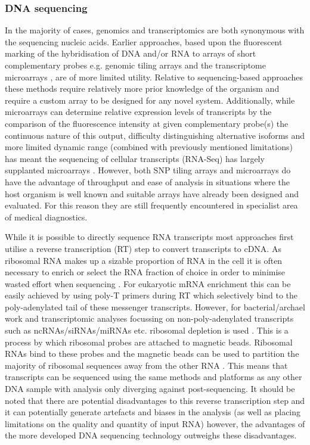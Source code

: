 \subsubsection{DNA sequencing}

In the majority of cases, genomics and transcriptomics are both synonymous with
the sequencing nucleic acids. Earlier approaches, based upon the fluorescent
marking of the hybridisation of DNA and/or RNA to arrays of short complementary probes 
e.g. genomic tiling arrays and the transcriptome microarrays \citep{Mockler2005}, are of more
limited utility.   Relative to sequencing-based approaches these methods
require relatively more prior knowledge of the organism and require a custom array to be
designed for any novel system. Additionally, while microarrays can determine relative expression levels
of transcripts by the comparison of the fluorescence intensity at given complementary probe(s)
the continuous nature of this output, difficulty distinguishing alternative isoforms 
and more limited dynamic range (combined with previously mentioned limitations) 
has meant the sequencing of cellular transcripts (RNA-Seq) has largely supplanted microarrays \citep{Wang2009}.
However, both SNP tiling arrays and microarrays do have the advantage of throughput and ease of analysis
in situations where the host organism is well known and suitable arrays have already been designed
and evaluated.  For this reason they are still frequently encountered in specialist area of medical 
diagnostics.


While it is possible to directly sequence RNA transcripts \citep{Ozsolak2009} most approaches first utilise a reverse transcription (RT)
step to convert transcripts to cDNA. As ribosomal RNA makes up a sizable proportion of RNA in the cell
it is often necessary to enrich or select the RNA fraction of choice in order to minimise wasted effort when
sequencing \citep{Wilhelm2009}.  For eukaryotic mRNA enrichment this can be easily achieved by
using poly-T primers during RT which selectively bind to the poly-adenylated tail of these messenger 
transcripts.  However, for bacterial/archael work and transcriptomic analyses focussing on non-poly-adenylated
transcripts such as ncRNAs/siRNAs/miRNAs etc. ribosomal depletion is used \citep{ONeil2013}.  This is a process by which 
ribosomal probes are attached to magnetic beads. Ribosomal RNAs bind to these probes and the magnetic
beads can be used to partition the majority of ribosomal sequences away from the other RNA \citep{ONeil2013}.
This means that transcripts can be sequenced using the same methods and platforms as any other DNA sample with analysis only diverging against post-sequencing.
It should be noted that there are potential disadvantages to this reverse transcription step and it
can potentially generate artefacts and biases in the analysis (as well as placing limitations on the quality
and quantity of input RNA) \citep{Ozsolak2011} however, the advantages of the more developed DNA sequencing technology outweighs these
disadvantages.

